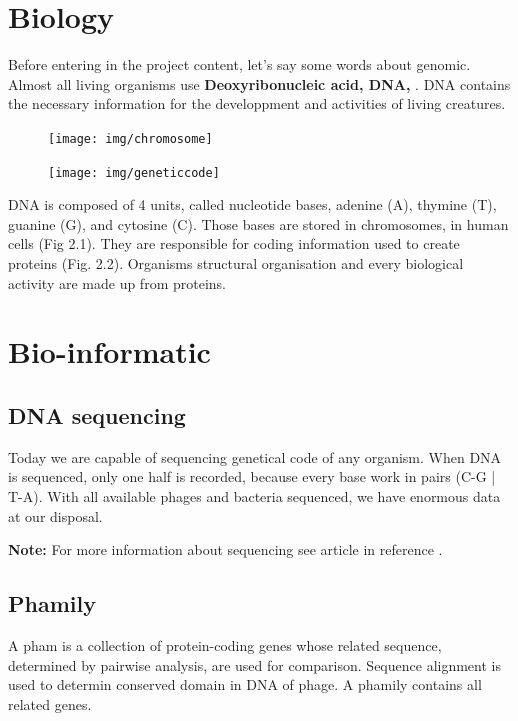\documentclass[a4paper,11pt]{report}
\begin{document}
\section{Biology}
Before entering in the project content, let's say some words about genomic. Almost all living organisms use \textbf{Deoxyribonucleic acid, DNA,} \cite{ref9}. DNA contains the necessary information for the developpment and activities of living creatures.

\begin{figure}[H]
\centering
\begin{minipage}{.5\textwidth}
  \centering
  \texttt{[image: img/chromosome]}
  \label{fig:test1}
\end{minipage}%
\begin{minipage}{.5\textwidth}
  \centering
  \texttt{[image: img/geneticcode]}
  \label{fig:test2}
\end{minipage}
\end{figure}

DNA is composed of 4 units, called nucleotide bases, adenine (A), thymine (T), guanine (G), and cytosine (C). Those bases are stored in chromosomes, in human cells (Fig 2.1). They are responsible for coding information used to create proteins (Fig. 2.2). Organisms structural organisation and every biological activity are made up from proteins.
\vspace{-0.6cm}
\section{Bio-informatic}
\vspace{-0.6cm}
\subsection{DNA sequencing}
\vspace{-0.2cm}
Today we are capable of sequencing genetical code of any organism. When DNA is sequenced, only one half is recorded, because every base work in pairs (C-G | T-A). With all available phages and bacteria sequenced, we have enormous data at our disposal.

\textbf{Note:} For more information about sequencing see article in reference \cite{ref9}.

\subsection{Phamily}
\vspace{-0.2cm}
A pham is a collection of protein-coding genes whose related sequence, determined by pairwise analysis, are used for comparison. Sequence alignment is used to determin conserved domain in DNA of phage. A phamily contains all related genes.
\end{document}
